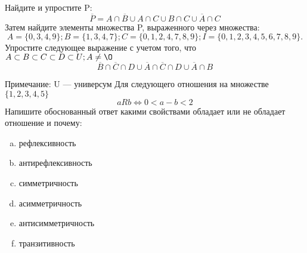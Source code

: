 \documentclass[10pt]{exam}
\begin{document}
\begin{questions}
\question
Найдите и упростите P:
\begin{equation*}
\overline{P} = A \cap \overline{B} \cup A \cap C \cup B \cap C \cup \overline{A} \cap C
\end{equation*}
Затем найдите элементы множества P, выраженного через множества:
\begin{equation*}
A = \{0, 3, 4, 9\}; 
B = \{1, 3, 4, 7\};
C = \{0, 1, 2, 4, 7, 8, 9\};
I = \{0, 1, 2, 3, 4, 5, 6, 7, 8, 9\}.
\end{equation*}\question
Упростите следующее выражение с учетом того, что $A\subset B \subset C \subset D \subset U; A \neq \O$
\begin{equation*}
\overline{B} \cap \overline{C} \cap D \cup \overline{A} \cap \overline{C} \cap D \cup \overline{A} \cap B
\end{equation*}

Примечание: U — универсум\question
Для следующего отношения на множестве $\{1, 2, 3, 4, 5\}$ 
\begin{equation*}
aRb \iff 0 < a-b<2
\end{equation*}
Напишите обоснованный ответ какими свойствами обладает или не обладает отношение и почему:   
\begin{enumerate} [a)]\setcounter{enumi}{0}
\item рефлексивность
\item антирефлексивность
\item симметричность
\item асимметричность
\item антисимметричность
\item транзитивность
\end{enumerate}


\end{questions}
\end{document}
